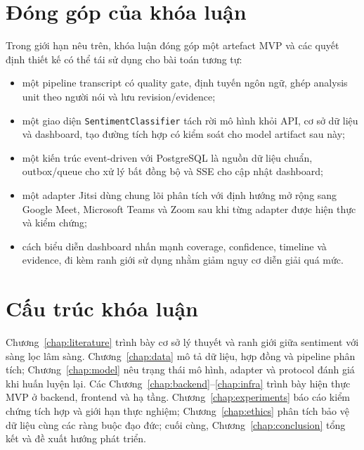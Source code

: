 \section{Đóng góp của khóa luận}
Trong giới hạn nêu trên, khóa luận đóng góp một artefact MVP và các quyết định thiết kế có thể tái sử dụng cho bài toán tương tự:
\begin{itemize}
  \item một pipeline transcript có quality gate, định tuyến ngôn ngữ, ghép analysis unit theo người nói và lưu revision/evidence;
  \item một giao diện \texttt{SentimentClassifier} tách rời mô hình khỏi API, cơ sở dữ liệu và dashboard, tạo đường tích hợp có kiểm soát cho model artifact sau này;
  \item một kiến trúc event-driven với PostgreSQL là nguồn dữ liệu chuẩn, outbox/queue cho xử lý bất đồng bộ và SSE cho cập nhật dashboard;
  \item một adapter Jitsi dùng chung lõi phân tích với định hướng mở rộng sang Google Meet, Microsoft Teams và Zoom sau khi từng adapter được hiện thực và kiểm chứng;
  \item cách biểu diễn dashboard nhấn mạnh coverage, confidence, timeline và evidence, đi kèm ranh giới sử dụng nhằm giảm nguy cơ diễn giải quá mức.
\end{itemize}

\section{Cấu trúc khóa luận}
Chương~\ref{chap:literature} trình bày cơ sở lý thuyết và ranh giới giữa sentiment với sàng lọc lâm sàng. Chương~\ref{chap:data} mô tả dữ liệu, hợp đồng và pipeline phân tích; Chương~\ref{chap:model} nêu trạng thái mô hình, adapter và protocol đánh giá khi huấn luyện lại. Các Chương~\ref{chap:backend}--\ref{chap:infra} trình bày hiện thực MVP ở backend, frontend và hạ tầng. Chương~\ref{chap:experiments} báo cáo kiểm chứng tích hợp và giới hạn thực nghiệm; Chương~\ref{chap:ethics} phân tích bảo vệ dữ liệu cùng các ràng buộc đạo đức; cuối cùng, Chương~\ref{chap:conclusion} tổng kết và đề xuất hướng phát triển.
